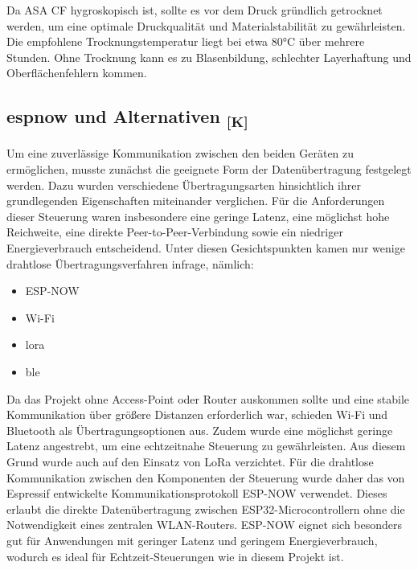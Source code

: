\documentclass[a4paper,12pt]{article}
\begin{document}
Da ASA CF hygroskopisch ist, sollte es vor dem Druck gründlich getrocknet werden, um eine optimale Druckqualität und Materialstabilität zu gewährleisten. Die empfohlene Trocknungstemperatur liegt bei etwa 80°C über mehrere Stunden. Ohne Trocknung kann es zu Blasenbildung, schlechter Layerhaftung und Oberflächenfehlern kommen.\cite{Bambu_Lab_Filament_ASA_CF}

\newpage


\subsection{\texorpdfstring{\gls{espnow} und Alternativen \textsubscript{[K]}}{ESP-NOW und Alternativen [K]}}
\label{sec:ESP-NOW und Alternativen}

Um eine zuverlässige Kommunikation zwischen den beiden Geräten zu ermöglichen, musste zunächst die geeignete Form der Datenübertragung festgelegt werden. Dazu wurden verschiedene Übertragungsarten hinsichtlich ihrer grundlegenden Eigenschaften miteinander verglichen. Für die Anforderungen dieser Steuerung waren insbesondere eine geringe Latenz, eine möglichst hohe Reichweite, eine direkte Peer-to-Peer-Verbindung sowie ein niedriger Energieverbrauch entscheidend. Unter diesen Gesichtspunkten kamen nur wenige drahtlose Übertragungsverfahren infrage, nämlich:
\begin{itemize}
    \item ESP-NOW\cite{esp_now_espressif}
    \item Wi-Fi
    \item \gls{lora}
    \item \gls{ble}
\end{itemize}

Da das Projekt ohne Access-Point oder Router\cite{esp32_wifi_api} auskommen sollte und eine stabile Kommunikation über größere Distanzen erforderlich war, schieden Wi-Fi und Bluetooth als Übertragungsoptionen aus. Zudem wurde eine möglichst geringe Latenz angestrebt, um eine echtzeitnahe Steuerung zu gewährleisten. Aus diesem Grund wurde auch auf den Einsatz von LoRa verzichtet. Für die drahtlose Kommunikation zwischen den Komponenten der Steuerung wurde daher das von Espressif entwickelte Kommunikationsprotokoll ESP-NOW verwendet. Dieses erlaubt die direkte Datenübertragung zwischen ESP32-Microcontrollern ohne die Notwendigkeit eines zentralen WLAN-Routers. ESP-NOW eignet sich besonders gut für Anwendungen mit geringer Latenz und geringem Energieverbrauch, wodurch es ideal für Echtzeit-Steuerungen wie in diesem Projekt ist. 
\end{document}
